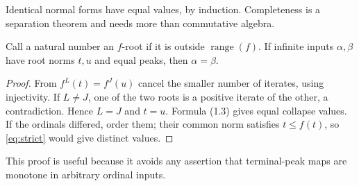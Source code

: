 \documentclass[11pt,a4paper]{article}
\begin{document}
Identical normal forms have equal values, by induction. Completeness is a
separation theorem and needs more than commutative algebra.

\begin{lemma}\label{lem:roots}
Call a natural number an $f$-root if it is outside $\operatorname{range}(f)$.
If infinite inputs $\alpha,\beta$ have root norms $t,u$ and equal peaks,
then $\alpha=\beta$.
\end{lemma}
\begin{proof}
From $f^L(t)=f^J(u)$ cancel the smaller number of iterates, using injectivity.
If $L\ne J$, one of the two roots is a positive iterate of the other, a
contradiction. Hence $L=J$ and $t=u$. Formula (1.3) gives equal collapse
values. If the ordinals differed, order them; their common norm satisfies
$t\le f(t)$, so \eqref{eq:strict} would give distinct values.
\end{proof}
This proof is useful because it avoids any assertion that terminal-peak
maps are monotone in arbitrary ordinal inputs.
\end{document}
